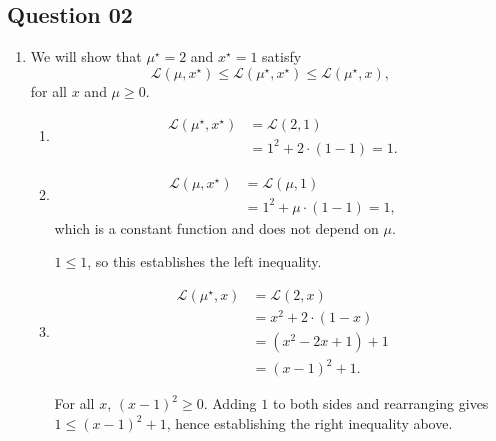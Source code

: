\documentclass{article}[a4paper]
\begin{document}
    \subsection*{Question 02}
    \begin{enumerate}[label=(\alph*), ref=2.\alph*]
        \item \label{q2a} We will show that $\mu^\star = 2$ and $x^\star = 1$ satisfy \[
            \mathcal{L} \left( \mu, x^\star \right)
            \leq
            \mathcal{L} \left( \mu^\star, x^\star \right)
            \leq
            \mathcal{L} \left( \mu^\star, x \right),
        \] for all $x$ and $\mu \geq 0$.
        
        \begin{enumerate}[label=(\roman*), ref=\theenumi.\roman*]
            \item \label{q2a_i}
            \begin{align*}
                \mathcal{L}\left( \mu^\star, x^\star \right)
                &=  \mathcal{L}\left( 2, 1 \right) \\
                &=  1^2 + 2 \cdot \left( 1 - 1 \right) = 1.
            \end{align*}
            
            \item \label{q2a_ii}
            \begin{align*}
                \mathcal{L}\left( \mu, x^\star \right)
                &=  \mathcal{L}\left( \mu, 1 \right) \\
                &=  1^2 + \mu \cdot \left( 1 - 1 \right) = 1,
            \end{align*}
            which is a constant function and does not depend on $\mu$.

            $1 \leq 1$, so this establishes the left inequality.
            
            \item \label{q2a_iii}
            \begin{align*}
                \mathcal{L}\left( \mu^\star, x \right)
                &=  \mathcal{L}\left( 2, x \right) \\
                &=  x^2 + 2 \cdot \left( 1 - x \right) \\
                &=  \left( x^2 - 2x + 1 \right) + 1 \\
                &=  \left( x - 1 \right)^2 + 1.
            \end{align*}

            For all $x$, $\left( x - 1 \right)^2 \geq 0$. Adding $1$ to both sides and rearranging gives $1 \leq \left( x - 1 \right)^2 + 1$, hence establishing the right inequality above.


\end{enumerate}
\end{enumerate}
\end{document}
